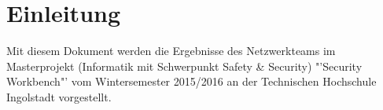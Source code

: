 \chapter{Einleitung}
Mit diesem Dokument werden die Ergebnisse des Netzwerkteams im Masterprojekt (Informatik mit Schwerpunkt Safety \& Security) "'Security Workbench"' vom Wintersemester 2015/2016 an der Technischen Hochschule Ingolstadt vorgestellt. \\